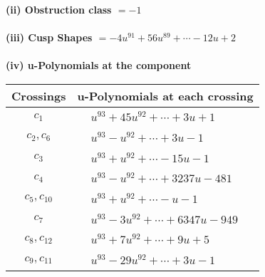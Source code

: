 \documentclass[1p]{elsarticle_modified}
\theoremstyle{definition}
\begin{document}
\flushleft \textbf{(ii) Obstruction class $= -1$}\\~\\
\flushleft \textbf{(iii) Cusp Shapes $= -4 u^{91}+56 u^{89}+\cdots-12 u+2$}\\~\\
\newpage\renewcommand{\arraystretch}{1}
\flushleft \textbf{(iv) u-Polynomials at the component}\newline \\
\begin{tabular}{m{50pt}|m{274pt}}
Crossings & \hspace{64pt}u-Polynomials at each crossing \\
\hline $$\begin{aligned}c_{1}\end{aligned}$$&$\begin{aligned}
&u^{93}+45 u^{92}+\cdots+3 u+1
\end{aligned}$\\
\hline $$\begin{aligned}c_{2},c_{6}\end{aligned}$$&$\begin{aligned}
&u^{93}- u^{92}+\cdots+3 u-1
\end{aligned}$\\
\hline $$\begin{aligned}c_{3}\end{aligned}$$&$\begin{aligned}
&u^{93}+u^{92}+\cdots-15 u-1
\end{aligned}$\\
\hline $$\begin{aligned}c_{4}\end{aligned}$$&$\begin{aligned}
&u^{93}- u^{92}+\cdots+3237 u-481
\end{aligned}$\\
\hline $$\begin{aligned}c_{5},c_{10}\end{aligned}$$&$\begin{aligned}
&u^{93}+u^{92}+\cdots- u-1
\end{aligned}$\\
\hline $$\begin{aligned}c_{7}\end{aligned}$$&$\begin{aligned}
&u^{93}-3 u^{92}+\cdots+6347 u-949
\end{aligned}$\\
\hline $$\begin{aligned}c_{8},c_{12}\end{aligned}$$&$\begin{aligned}
&u^{93}+7 u^{92}+\cdots+9 u+5
\end{aligned}$\\
\hline $$\begin{aligned}c_{9},c_{11}\end{aligned}$$&$\begin{aligned}
&u^{93}-29 u^{92}+\cdots+3 u-1
\end{aligned}$\\
\hline
\end{tabular}\\~\\
\end{document}
